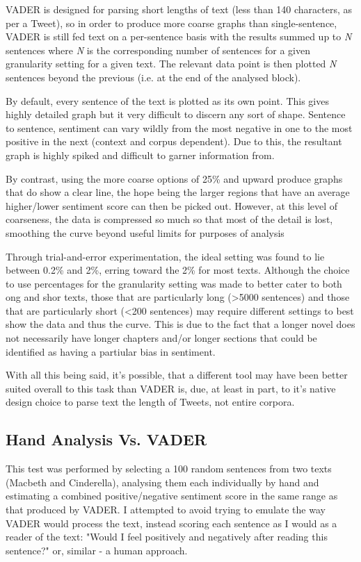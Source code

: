\documentclass[a4paper]{article}
\begin{document}
        VADER is designed for parsing short lengths of text (less than 140 characters, as per a Tweet), so in order to produce more coarse graphs than single-sentence, VADER is still fed text on a per-sentence basis with the results summed up to \textit{N} sentences where \textit{N} is the corresponding number of sentences for a given granularity setting for a given text. The relevant data point is then plotted \textit{N} sentences beyond the previous (i.e. at the end of the analysed block).

        By default, every sentence of the text is plotted as its own point. This gives highly detailed graph but it very difficult to discern any sort of shape. Sentence to sentence, sentiment can vary wildly from the most negative in one to the most positive in the next (context and corpus dependent). Due to this, the resultant graph is highly spiked and difficult to garner information from.

        By contrast, using the more coarse options of 25\% and upward produce graphs that do show a clear line, the hope being the larger regions that have an average higher/lower sentiment score can then be picked out. However, at this level of coarseness, the data is compressed so much so that most of the detail is lost, smoothing the curve beyond useful limits for purposes of analysis

        Through trial-and-error experimentation, the ideal setting was found to lie between 0.2\% and 2\%, erring toward the 2\% for most texts. Although the choice to use percentages for the granularity setting was made to better cater to both ong and shor texts, those that are particularly long (>5000 sentences) and those that are particularly short (<200 sentences) may require different settings to best show the data and thus the curve. This is due to the fact that a longer novel does not necessarily have longer chapters and/or longer sections that could be identified as having a partiular bias in sentiment. 
        
        With all this being said, it's possible, that a different tool may have been better suited overall to this task than VADER is, due, at least in part, to it's native design choice to parse text the length of Tweets, not entire corpora.
    \subsection{Hand Analysis Vs. VADER}
        This test was performed by selecting a 100 random sentences from two texts (Macbeth and Cinderella), analysing them each individually by hand and estimating a combined positive/negative sentiment score in the same range as that produced by VADER. I attempted to avoid trying to emulate the way VADER would process the text, instead scoring each sentence as I would as a reader of the text: "Would I feel positively and negatively after reading this sentence?" or, similar - a human approach.
        
\end{document}
